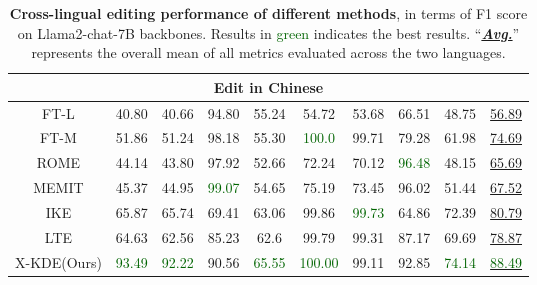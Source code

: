 \begin{table*}[t]
{\begin{tabular}{cccccccccc}
    \multicolumn{10}{c}{\textbf{Edit in Chinese}} \\
    \toprule
FT-L & 40.80 & 40.66 & 94.80 & 55.24 & 54.72 & 53.68 & 66.51 & 48.75 & \underline{56.89}\\
FT-M & 51.86 & 51.24 & 98.18 & 55.30 & \textcolor{darkgreen}{100.0} & 99.71 & 79.28 & 61.98 & \underline{74.69}\\
ROME & 44.14 & 43.80 & 97.92 & 52.66 & 72.24 & 70.12 & \textcolor{darkgreen}{96.48} & 48.15 & \underline{65.69}\\
MEMIT & 45.37 & 44.95 & \textcolor{darkgreen}{99.07} & 54.65 & 75.19 & 73.45 & 96.02 & 51.44 & \underline{67.52}\\ 
IKE & 65.87 & 65.74 & 69.41 & 63.06 & 99.86 & \textcolor{darkgreen}{99.73} & 64.86 & 72.39 &  \underline{80.79} \\ 
LTE & 64.63 & 62.56 & 85.23 & 62.6 & 99.79 & 99.31 & 87.17 & 69.69 &  \underline{78.87} \\
\cmidrule{1-10}
X-KDE(Ours) & \textcolor{darkgreen}{93.49} & \textcolor{darkgreen}{92.22} & 90.56 & \textcolor{darkgreen}{65.55} & \textcolor{darkgreen}{100.00} & 99.11 & 92.85 & \textcolor{darkgreen}{74.14} & \underline{\textcolor{darkgreen}{88.49}} \\
    \bottomrule
    \end{tabular}
}
    \caption{
    \textbf{Cross-lingual editing performance of different methods}, in terms of F1 score on Llama2-chat-7B backbones. Results in \textcolor{darkgreen}{green} indicates the best results. ``\underline{\textbf{\textit{Avg.}}}'' represents the overall mean of all metrics evaluated across the two languages.
    }
    \label{table:F1-res}
\end{table*}

